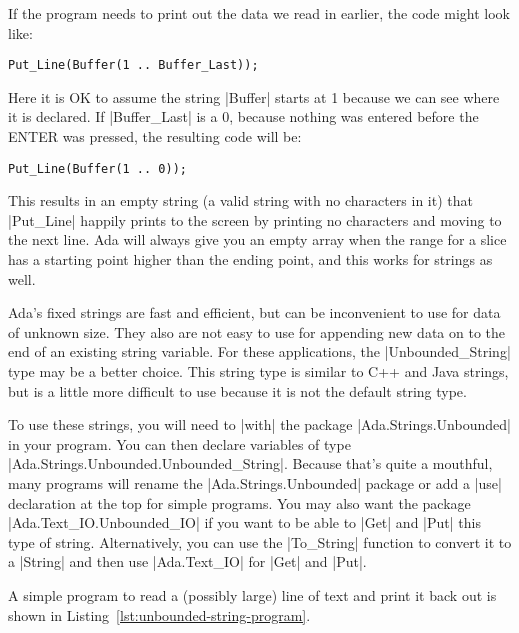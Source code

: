 If the program needs to print out the data we read in earlier, the code might look like:

\begin{lstlisting}
Put_Line(Buffer(1 .. Buffer_Last));
\end{lstlisting}

\noindent Here it is OK to assume the string |Buffer| starts at 1 because we can see where it is
declared. If |Buffer_Last| is a 0, because nothing was entered before the ENTER was pressed, the
resulting code will be:

\begin{lstlisting}
Put_Line(Buffer(1 .. 0));
\end{lstlisting}

\noindent This results in an empty string (a valid string with no characters in it) that
|Put_Line| happily prints to the screen by printing no characters and moving to the next
line. Ada will always give you an empty array when the range for a slice has a starting point
higher than the ending point, and this works for strings as well.

Ada's fixed strings are fast and efficient, but can be inconvenient to use for data of unknown
size. They also are not easy to use for appending new data on to the end of an existing string
variable.  For these applications, the |Unbounded_String| type may be a better choice. This
string type is similar to C++ and Java strings, but is a little more difficult to use because it
is not the default string type.

To use these strings, you will need to |with| the package |Ada.Strings.Unbounded| in your
program. You can then declare variables of type |Ada.Strings.Unbounded.Unbounded_String|.
Because that's quite a mouthful, many programs will rename the |Ada.Strings.Unbounded| package
or add a |use| declaration at the top for simple programs. You may also want the package
|Ada.Text_IO.Unbounded_IO| if you want to be able to |Get| and |Put| this type of string.
Alternatively, you can use the |To_String| function to convert it to a |String| and then use
|Ada.Text_IO| for |Get| and |Put|.

A simple program to read a (possibly large) line of text and print it back out is shown in
Listing~\ref{lst:unbounded-string-program}.

